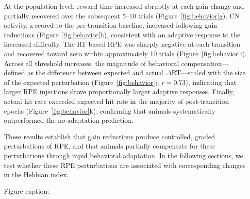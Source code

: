 \documentclass[
  journal=medium,
  manuscript=preprint,
  year=2026
]{aind-preprint}
\begin{document}
At the population level, reward time increased abruptly at each gain change and partially recovered over the subsequent 5--10 trials (Figure~\ref{fig:behavior}g). CN activity, z-scored to the pre-transition baseline, increased following gain reductions (Figure~\ref{fig:behavior}h), consistent with an adaptive response to the increased difficulty. The RT-based RPE was sharply negative at each transition and recovered toward zero within approximately 10 trials (Figure~\ref{fig:behavior}i). Across all threshold increases, the magnitude of behavioral compensation---defined as the difference between expected and actual $\Delta$RT---scaled with the size of the expected perturbation (Figure~\ref{fig:behavior}j; $r = 0.73$), indicating that larger RPE injections drove proportionally larger adaptive responses. Finally, actual hit rate exceeded expected hit rate in the majority of post-transition epochs (Figure~\ref{fig:behavior}k), confirming that animals systematically outperformed the no-adaptation prediction.

These results establish that gain reductions produce controlled, graded perturbations of RPE, and that animals partially compensate for these perturbations through rapid behavioral adaptation. In the following sections, we test whether these RPE perturbations are associated with corresponding changes in the Hebbian index.

Figure caption:
\end{document}
